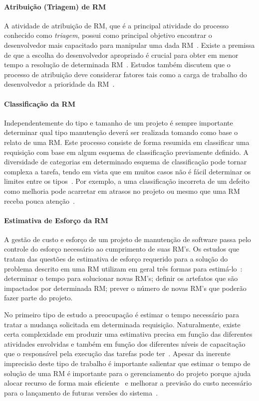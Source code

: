 \todoend


\paragraph{Atribuição (Triagem) de RM} A atividade de atribuição de RM, que é a
principal atividade do processo conhecido como \textit{triagem}, possui como
principal objetivo encontrar o desenvolvedor mais capacitado para manipular uma
dada RM~\cite{cavalcanti2014challenges}. Existe a premissa de que a escolha do
desenvolvedor apropriado é crucial para obter em menor tempo a re\-so\-lu\-ção
de determinada RM~\cite{di2002approach}. Estudos também discutem que o processo
de atribuição deve considerar fatores tais como a carga de trabalho do
desenvolvedor a prioridade da RM~\cite{aljarah2011selecting}.

\paragraph{Classificação da RM} Independentemente do tipo e tamanho de um
projeto é sempre importante determinar qual tipo manutenção deverá ser realizada
tomando como base o relato de uma RM\@.  Este processo consiste de forma
resumida em classificar uma requisição com base em algum esquema de
classificação previamente definido. A diversidade de categorias em determinado
esquema de classificação pode tornar complexa a tarefa, tendo em vista que em
muitos casos não é fácil determinar os limites entre os
tipos~\cite{antoniol2008bug}. Por exemplo, a uma classificação incorreta de um
defeito como melhoria pode acarretar em atrasos no projeto ou mesmo que uma RM
receba pouca atenção~\cite{cavalcanti2014challenges}.

\paragraph{Estimativa de Esforço da RM} A gestão de custo e esforço de um
projeto de manutenção de software passa pelo controle do esforço necessário ao
cumprimento de suas RM's. Os estudos que tratam das questões de estimativa de
esforço requerido para a solução do problema descrito em uma RM utilizam em
geral três formas para estimá-lo~\cite{cavalcanti2014challenges}: determinar o
tempo para solucionar novas RM's; definir os artefatos que são impactados por
determinada RM\@; prever o número de novas RM's que poderão fazer parte do
projeto.

No primeiro tipo de estudo a preocupação é estimar o tempo necessário para
tratar a mudança solicitada em determinada requisição. Naturalmente, existe
certa complexidade em produzir uma estimativa precisa em função das diferentes
atividades envolvidas e também em função dos diferentes níveis de capacitação
que o responsável pela execução das tarefas pode ter~\cite{xia2015automatic}.
Apesar da inerente imprecisão deste tipo de trabalho é importante salientar que
estimar o tempo de solução de uma RM é importante para o gerenciamento do
projeto porque ajuda alocar recurso de forma mais
eficiente~\cite{Bhattacharya:2011:BTP:1985441.1985472} e melhorar a previsão do
custo necessário para o lançamento de futuras versões do
sistema~\cite{Vijayakumar2014}.

